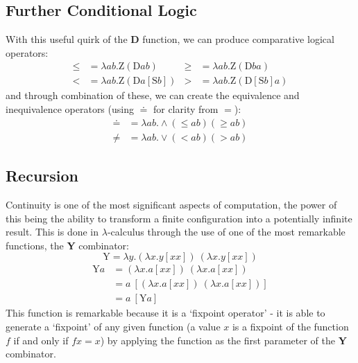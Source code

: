 \documentclass[Master.tex]{subfiles}
\begin{document}
\subsection{Further Conditional Logic}

With this useful quirk of the \textbf{D} function, we can produce comparative logical operators:
\begin{equation*}
\begin{aligned}
\bm{\leq} &= \lambda ab.\bm{\mathrm{Z}}(\bm{\mathrm{D}}ab)
  & %
\bm{\geq} &= \lambda ab.\bm{\mathrm{Z}}(\bm{\mathrm{D}}ba)
  \\
\bm{<} &= \lambda ab.\bm{\mathrm{Z}}(\bm{\mathrm{D}}a[\bm{\mathrm{S}}b])
  &
\bm{>} &= \lambda ab.\bm{\mathrm{Z}}(\bm{\mathrm{D}}[\bm{\mathrm{S}}b]a)
\end{aligned}
\end{equation*}
and through combination of these, we can create the equivalence and inequivalence operators (using $\bm{\doteq}$ for clarity from $=$):
\begin{equation*}
\begin{aligned}
\bm{\doteq} &= \lambda ab.\wedge(\bm{\leq}ab)(\bm{\geq}ab)\\
\bm{\neq} &= \lambda ab.\vee(\bm{<}ab)(\bm{>}ab)
\end{aligned}
\end{equation*}
\subsection{Recursion}

Continuity is one of the most significant aspects of computation, the power of this being the ability to transform a finite configuration into a potentially infinite result. This is done in $\lambda$-calculus through the use of one of the most remarkable functions, the \textbf{Y} combinator:
\cite{rojas2015lambdatutorial}
\begin{equation*}
\bm{\mathrm{Y}} = \lambda y.(\lambda x.y[xx])\ (\lambda x.y[xx])
\end{equation*}
\begin{equation*}
\begin{aligned}
\bm{\mathrm{Y}}a &= (\lambda x.a[xx])\ (\lambda x.a[xx])\\
&= a\ [(\lambda x.a[xx])\ (\lambda x.a[xx])]\\
&= a\ [\bm{\mathrm{Y}}a]
\end{aligned}
\end{equation*}
This function is remarkable because it is a `fixpoint operator' - it is able to generate a `fixpoint' of any given function (a value $x$ is a fixpoint of the function $f$ if and only if $fx = x$) by applying the function as the first parameter of the \textbf{Y} combinator.
\end{document}

